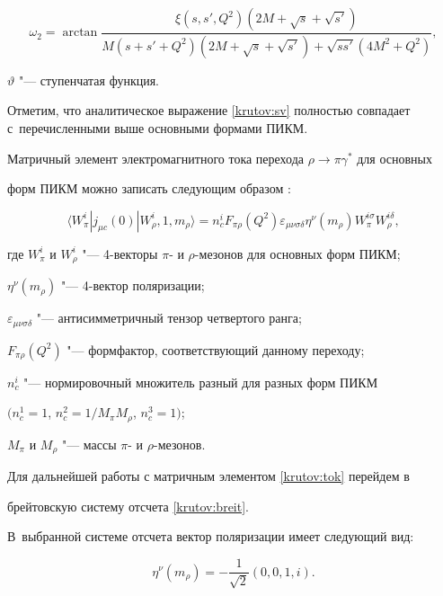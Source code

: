 $$\omega_2=\arctan\frac{\xi(s,s',Q^2)(2M+\sqrt{s}+\sqrt{s'})}{M(s+s'+Q^2)(2M+\sqrt{s}+\sqrt{s'})+\sqrt{ss'}(4M^2+Q^2)},$$

 $\vartheta$ "--- ступенчатая функция.



Отметим, что аналитическое выражение \eqref{krutov:sv} полностью совпадает с~перечисленными выше основными формами ПИКМ. 



\smallskip




Матричный элемент электромагнитного тока перехода $\rho \to \pi\gamma^{*}$ для основных

форм ПИКМ можно записать следующим образом \cite{CaG95}:

\begin{equation}\label{krutov:tok}

\langle{W^i_{\pi}}|j_{\mu c}(0)|{W^i_{\rho}}, 1, m_{\rho}\rangle=n_{c}^{i}F_{\pi\rho}(Q^2)

\varepsilon_{\mu \nu \sigma \delta}

\eta^{\nu}(m_{\rho})W_{\pi}^{i\sigma}W_{\rho}^{i\delta},

\end{equation}

где $W^i_{\pi}$ и $W^i_{\rho}$ "--- 4-векторы $\pi$- и  $\rho$-мезонов для основных форм ПИКМ; 

$\eta^{\nu}(m_{\rho})$ "--- 4-вектор  поляризации;

$\varepsilon_{\mu \nu \sigma \delta}$ "--- антисимметричный тензор четвертого ранга; 

 $F_{\pi\rho}(Q^2)$ "--- формфактор, соответствующий  данному переходу; 

 $n_{c}^{i}$ "--- нормировочный множитель  разный для разных форм ПИКМ

$(n^{1}_{c}=1$, $n^{2}_{c}=1/M_{\pi}M_{\rho}$, $n^{3}_{c}=1)$; 

$M_{\pi}$ и $M_{\rho}$ "--- массы $\pi$- и $\rho$-мезонов.



Для дальнейшей работы с матричным элементом \eqref{krutov:tok} перейдем в

брейтовскую систему отсчета \eqref{krutov:breit}. 

В~выбранной системе отсчета вектор поляризации имеет следующий вид:

\begin{equation}\label{krutov:pol}

\eta^{\nu}(m_{\rho})=-\frac{1}{\sqrt{2}}(0, 0, 1, i).

\end{equation}





